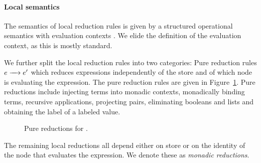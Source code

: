 \paragraph{Local semantics}
The semantics of local reduction rules is given by a structured operational semantics with evaluation contexts \cite{Felleisen:1988:TPF:73560.73576}. We elide the definition of the evaluation context, as this is mostly standard.

We further split the local reduction rules into two categories: Pure reduction rules $\steppure{\expr}{\expr'}$ which reduces expressions independently of the store and of which node is evaluating the expression. The pure reduction rules are given in Figure~\ref{fig:pure-reductions}. Pure reductions include injecting terms into monadic contexts, monadically binding terms, recursive applications, projecting pairs, eliminating booleans and lists and obtaining the label of a labeled value.

\begin{figure}
    \centering
    \caption{Pure reductions for \lang.}
    \label{fig:pure-reductions}
\end{figure}

The remaining local reductions all depend either on store or on the identity of the node that evaluates the expression. We denote these as \emph{monadic reductions}.

